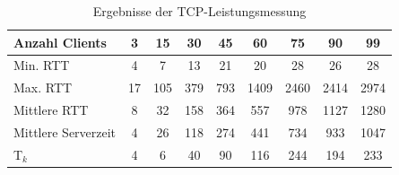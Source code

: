 \documentclass[11pt,a4paper,titlepage]{scrartcl}
\numberwithin{equation}{section}
\begin{document}
\renewcommand{\arraystretch}{1.5}
\begin{table}[ht]
	\begin{center}
		\begin{tabular}{|l|c|c|c|c|c|c|c|c|}
			\hline
			Anzahl Clients& \cellcolor{lightgrey}\textbf{3} & \textbf{15} & \cellcolor{lightgrey}\textbf{30} & \textbf{45} & \cellcolor{lightgrey}\textbf{60} & \textbf{75} & \cellcolor{lightgrey}\textbf{90} & \textbf{99} \\ \hline
			Min. RTT & \cellcolor{lightgrey}4 & 7 &\cellcolor{lightgrey}13 & 21 & \cellcolor{lightgrey}20 & 28 & \cellcolor{lightgrey}26 & 28 \\ \hline
			Max. RTT& \cellcolor{lightgrey}17 & 105 & \cellcolor{lightgrey}379 & 793 & \cellcolor{lightgrey}1409 & 2460 & \cellcolor{lightgrey}2414 & 2974\\ \hline
			Mittlere RTT & \cellcolor{lightgrey}8 & 32 & \cellcolor{lightgrey}158 & 364 & \cellcolor{lightgrey}557 & 978 & \cellcolor{lightgrey}1127 & 1280 \\ \hline
			Mittlere Serverzeit& \cellcolor{lightgrey}4 & 26 & \cellcolor{lightgrey}118 & 274 & \cellcolor{lightgrey}441 & 734 & \cellcolor{lightgrey}933 & 1047 \\ \hline
			T$_{k}$& \cellcolor{lightgrey}4 & 6 & \cellcolor{lightgrey}40 & 90 & \cellcolor{lightgrey}116 & 244 & \cellcolor{lightgrey}194 & 233 \\ \hline
		\end{tabular}
		\caption{Ergebnisse der TCP-Leistungsmessung}\label{tbl:evalTCP}
	\end{center}
\end{table}
\renewcommand{\arraystretch}{1}
\end{document}
